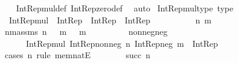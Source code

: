 \begin{isabellebody}
%
\isadelimproof
\ \ %
\endisadelimproof
%
\isatagproof
{}\isamarkupfalse%
\ Int{\isacharunderscore}{\kern0pt}Rep{\isacharunderscore}{\kern0pt}mul{\isacharunderscore}{\kern0pt}def\ Int{\isacharunderscore}{\kern0pt}Rep{\isacharunderscore}{\kern0pt}zero{\isacharunderscore}{\kern0pt}def\ \isamarkupfalse%
\ auto%
\endisatagproof
{\isafoldproof}%
%
\isadelimproof
\isanewline
%
\endisadelimproof
\isanewline
{}\isamarkupfalse%
\ Int{\isacharunderscore}{\kern0pt}Rep{\isacharunderscore}{\kern0pt}mul{\isacharunderscore}{\kern0pt}type\ {\isacharbrackleft}{\kern0pt}type{\isacharbrackright}{\kern0pt}{\isacharcolon}{\kern0pt}\isanewline
\ \ {\isachardoublequoteopen}Int{\isacharunderscore}{\kern0pt}Rep{\isacharunderscore}{\kern0pt}mul\ {\isacharcolon}{\kern0pt}\ Int{\isacharunderscore}{\kern0pt}Rep\ {\isasymRightarrow}\ Int{\isacharunderscore}{\kern0pt}Rep\ {\isasymRightarrow}\ Int{\isacharunderscore}{\kern0pt}Rep{\isachardoublequoteclose}\isanewline
%
\isadelimproof
%
\endisadelimproof
%
\isatagproof
{}\isamarkupfalse%
\ {\isacharminus}{\kern0pt}\isanewline
\ \ \isacommand{{\isacharbraceleft}{\kern0pt}}\isamarkupfalse%
\isanewline
\ \ \ \ \isamarkupfalse%
\ n\ m\ \isamarkupfalse%
\ n{\isacharunderscore}{\kern0pt}m{\isacharunderscore}{\kern0pt}assms{\isacharcolon}{\kern0pt}\ {\isachardoublequoteopen}n\ {\isasymin}\ {\isasymnat}{\isachardoublequoteclose}\ {\isachardoublequoteopen}m\ {\isasymin}\ {\isasymnat}{\isachardoublequoteclose}\ {\isachardoublequoteopen}m\ {\isasymnoteq}\ {}{\isachardoublequoteclose}\isanewline
\ \ \ \ \isamarkupfalse%
\ \isamarkupfalse%
\ nonneg{\isacharunderscore}{\kern0pt}neg{\isacharcolon}{\kern0pt}\isanewline
\ \ \ \ \ \ {\isachardoublequoteopen}Int{\isacharunderscore}{\kern0pt}Rep{\isacharunderscore}{\kern0pt}mul\ {\isacharparenleft}{\kern0pt}Int{\isacharunderscore}{\kern0pt}Rep{\isacharunderscore}{\kern0pt}nonneg\ n{\isacharparenright}{\kern0pt}\ {\isacharparenleft}{\kern0pt}Int{\isacharunderscore}{\kern0pt}Rep{\isacharunderscore}{\kern0pt}neg\ m{\isacharparenright}{\kern0pt}\ {\isacharcolon}{\kern0pt}\ Int{\isacharunderscore}{\kern0pt}Rep{\isachardoublequoteclose}\isanewline
\ \ \ \ \isamarkupfalse%
\ {\isacharparenleft}{\kern0pt}cases\ n\ rule{\isacharcolon}{\kern0pt}\ mem{\isacharunderscore}{\kern0pt}natE{\isacharparenright}{\kern0pt}\isanewline
\ \ \ \ \ \ \isamarkupfalse%
\ {\isacharparenleft}{\kern0pt}succ\ n{\isacharparenright}{\kern0pt}\isanewline
\ \ \ \ \ \ \isamarkupfalse%

\end{isabellebody}
